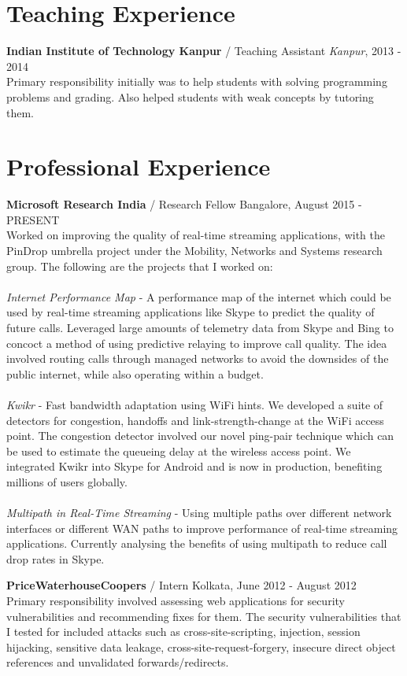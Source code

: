\documentclass[margin,line]{res}
\begin{document}
\begin{resume}
\section{\sc Teaching Experience}
{\bf Indian Institute of Technology Kanpur} / Teaching Assistant {\hfill}{\em Kanpur}, 2013 - 2014 \\
Primary responsibility initially was to help students with solving programming problems and grading. Also helped students with weak concepts by tutoring them.

\section{\sc Professional Experience}
{\bf Microsoft Research India} / Research Fellow {\hfill}Bangalore, August 2015 - PRESENT \\
Worked on improving the quality of real-time streaming applications, with the PinDrop umbrella project under the Mobility, Networks and Systems research group. The following are the projects that I worked on: \\
\\
{\em Internet Performance Map} - A performance map of the internet which could be used by real-time streaming applications like Skype to predict the quality of future calls. Leveraged large amounts of telemetry data from Skype and Bing to concoct a method of using predictive relaying to improve call quality. The idea involved routing calls through managed networks to avoid the downsides of the public internet, while also operating within a budget. \\
\\
{\em Kwikr} - Fast bandwidth adaptation using WiFi hints. We developed a suite of detectors for congestion, handoffs and link-strength-change at the WiFi access point. The congestion detector involved our novel ping-pair technique which can be used to estimate the queueing delay at the wireless access point. We integrated Kwikr into Skype for Android and is now in production, benefiting millions of users globally. \\
\\
{\em Multipath in Real-Time Streaming} - Using multiple paths over different network interfaces or different WAN paths to improve performance of real-time streaming applications. Currently analysing the benefits of using multipath to reduce call drop rates in Skype.

{\bf PriceWaterhouseCoopers} / Intern {\hfill} Kolkata, June 2012 - August 2012 \\
Primary responsibility involved assessing web applications for security vulnerabilities and recommending fixes for them. The security vulnerabilities that I tested for included attacks such as cross-site-scripting, injection, session hijacking, sensitive data leakage, cross-site-request-forgery, insecure direct object references and unvalidated forwards/redirects. 


\end{resume}
\end{document}
